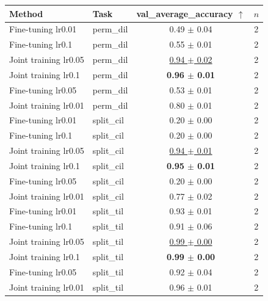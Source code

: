 \begin{tabular}{llcc}
\toprule
Method & Task & val\_average\_accuracy $\uparrow$ & $n$ \\
\midrule
Fine-tuning lr0.01 & perm\_dil & 0.49 $\pm$ 0.04 & 2 \\
Fine-tuning lr0.1 & perm\_dil & 0.55 $\pm$ 0.01 & 2 \\
Joint training lr0.05 & perm\_dil & \underline{0.94 $\pm$ 0.02} & 2 \\
Joint training lr0.1 & perm\_dil & \textbf{0.96 $\pm$ 0.01} & 2 \\
Fine-tuning lr0.05 & perm\_dil & 0.53 $\pm$ 0.01 & 2 \\
Joint training lr0.01 & perm\_dil & 0.80 $\pm$ 0.01 & 2 \\
\midrule
Fine-tuning lr0.01 & split\_cil & 0.20 $\pm$ 0.00 & 2 \\
Fine-tuning lr0.1 & split\_cil & 0.20 $\pm$ 0.00 & 2 \\
Joint training lr0.05 & split\_cil & \underline{0.94 $\pm$ 0.01} & 2 \\
Joint training lr0.1 & split\_cil & \textbf{0.95 $\pm$ 0.01} & 2 \\
Fine-tuning lr0.05 & split\_cil & 0.20 $\pm$ 0.00 & 2 \\
Joint training lr0.01 & split\_cil & 0.77 $\pm$ 0.02 & 2 \\
\midrule
Fine-tuning lr0.01 & split\_til & 0.93 $\pm$ 0.01 & 2 \\
Fine-tuning lr0.1 & split\_til & 0.91 $\pm$ 0.06 & 2 \\
Joint training lr0.05 & split\_til & \underline{0.99 $\pm$ 0.00} & 2 \\
Joint training lr0.1 & split\_til & \textbf{0.99 $\pm$ 0.00} & 2 \\
Fine-tuning lr0.05 & split\_til & 0.92 $\pm$ 0.04 & 2 \\
Joint training lr0.01 & split\_til & 0.96 $\pm$ 0.01 & 2 \\
\bottomrule
\end{tabular}
